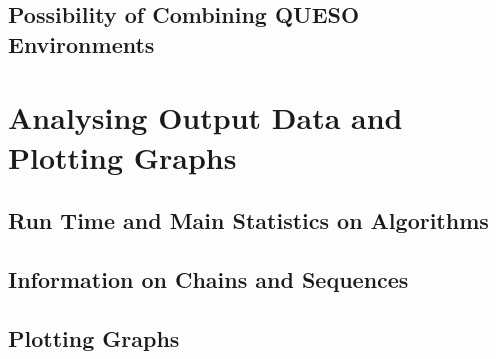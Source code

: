 \subsection{Possibility of Combining QUESO Environments}

\section{Analysing Output Data and Plotting Graphs}

\subsection{Run Time and Main Statistics on Algorithms}

\subsection{Information on Chains and Sequences}

\subsection{Plotting Graphs}

